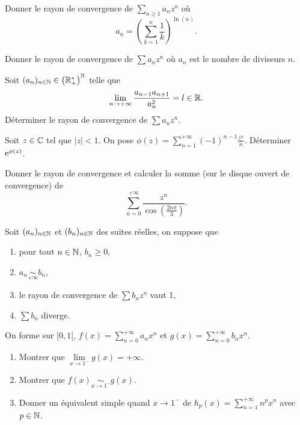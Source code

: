 \documentclass[12pt]{article}
\begin{document}
\begin{exercise}
    Donner le rayon de convergence de $\sum_{n\geqslant1}a_{n}z^{n}$ où 
    \begin{equation}
        a_n=\left(\sum_{k=1}^{n}\frac{1}{k}\right)^{\ln(n)}.
    \end{equation}
\end{exercise}

\begin{exercise}
    Donner le rayon de convergence de $\sum a_{n}z^{n}$ où $a_n$ est le nombre de diviseurs $n$.
\end{exercise}

\begin{exercise}
    Soit $(a_n)_{n\in\mathbb{N}}\in\left(\mathbb{R}_{+}^{*}\right)^{\mathbb{N}}$ telle que 
    \begin{equation}
        \lim\limits_{n\to+\infty}\frac{a_{n-1}a_{n+1}}{a_{n}^{2}}=l\in\mathbb{R}.
    \end{equation}
    Déterminer le rayon de convergence de $\sum a_{n}z^{n}$.
\end{exercise}

\begin{exercise}
    Soit $z\in\mathbb{C}$ tel que $\left\lvert z\right\rvert<1$. On pose $\phi(z)=\sum_{n=1}^{+\infty}(-1)^{n-1}\frac{z^{n}}{n}$. Déterminer $\mathrm{e}^{\phi(z)}$.
\end{exercise}

\begin{exercise}
    Donner le rayon de convergence et calculer la somme (sur le disque ouvert de convergence) de 
    \begin{equation}
        \sum_{n=0}^{+\infty}\frac{z^{n}}{\cos\left(\frac{2n\pi}{3}\right)}.
    \end{equation}
\end{exercise}

\begin{exercise}
    Soit $(a_n)_{n\in\mathbb{N}}$ et $(b_n)_{n\in\mathbb{N}}$ des suites réelles, on suppose que
    \begin{enumerate}[label=\roman*)]
        \item pour tout $n\in\mathbb{N}$, $b_n\geqslant0$,
        \item $a_n\underset{+\infty}{\sim}b_n$,
        \item le rayon de convergence de $\sum b_{n}z^{n}$ vaut 1,
        \item $\sum b_{n}$ diverge.
    \end{enumerate}

    On forme sur $[0,1[$, $f(x)=\sum_{n=0}^{+\infty}a_{n}x^{n}$ et $g(x)=\sum_{n=0}^{+\infty}b_{n}x^{n}$.

    \begin{enumerate}
        \item Montrer que $\lim\limits_{x\to1^{-}}g(x)=+\infty$.
        \item Montrer que $f(x)\underset{x\to1^{-}}{\sim}g(x)$.
        \item Donner un équivalent simple quand $x\to1^{-}$ de $h_p(x)=\sum_{n=1}^{+\infty}n^{p}x^{n}$ avec $p\in\mathbb{N}$.
    \end{enumerate}
\end{exercise}
\end{document}
